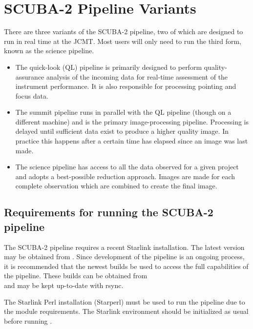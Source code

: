 \section{SCUBA-2 Pipeline Variants\label{se:pipelines}}

There are three variants of the SCUBA-2 pipeline, two of which are
designed to run in real time at the JCMT. Most users will only need to
run the third form, known as the science pipeline.

\begin{itemize}
\item The quick-look (QL) pipeline is primarily designed to perform
  quality-assurance analysis of the incoming data for real-time
  assessment of the instrument performance. It is also responsible for
  processing pointing and focus data.

\item The summit pipeline runs in parallel with the QL pipeline
  (though on a different machine) and is the primary image-processing
  pipeline. Processing is delayed until sufficient data exist to
  produce a higher quality image. In practice this happens after a
  certain time has elapsed since an image was last made.

\item The science pipeline has access to all the data observed for a
  given project and adopts a best-possible reduction approach. Images
  are made for each complete observation which are combined to create
  the final image.
\end{itemize}

\subsection{Requirements for running the SCUBA-2 pipeline}

The SCUBA-2 pipeline requires a recent Starlink installation. The
latest version may be obtained from
. Since
development of the pipeline is an ongoing process, it is recommended
that the newest builds be used to access the full capabilities of the
pipeline. These builds can be obtained from\\
and may be kept up-to-date with rsync.

The Starlink Perl installation (Starperl) must be used to run the
pipeline due to the module requirements. The Starlink environment should be
initialized as usual before running \oracdr.


